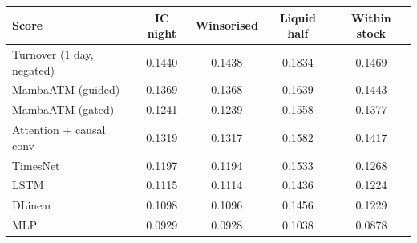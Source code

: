 {\footnotesize
\setlength{\tabcolsep}{3pt}
\begin{tabular}{lcccc}
\toprule
\textbf{Score} & \textbf{IC night} & \textbf{Winsorised} & \textbf{Liquid half} & \textbf{Within stock} \\
\midrule
Turnover (1 day, negated) & 0.1440 & 0.1438 & 0.1834 & 0.1469 \\
MambaATM (guided) & 0.1369 & 0.1368 & 0.1639 & 0.1443 \\
MambaATM (gated) & 0.1241 & 0.1239 & 0.1558 & 0.1377 \\
Attention + causal conv & 0.1319 & 0.1317 & 0.1582 & 0.1417 \\
TimesNet & 0.1197 & 0.1194 & 0.1533 & 0.1268 \\
LSTM & 0.1115 & 0.1114 & 0.1436 & 0.1224 \\
DLinear & 0.1098 & 0.1096 & 0.1456 & 0.1229 \\
MLP & 0.0929 & 0.0928 & 0.1038 & 0.0878 \\
\bottomrule
\end{tabular}
}
